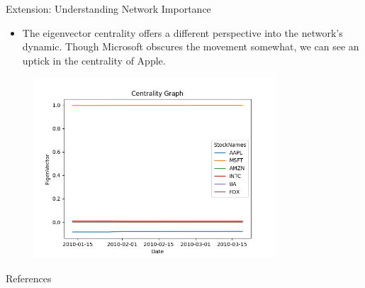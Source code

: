 \documentclass{beamer}
\begin{document}


\begin{frame}{Extension: Understanding Network Importance}
    \begin{itemize}
        \item The eigenvector centrality offers a different perspective into the network's dynamic. Though Microsoft obscures the movement somewhat, we can see an uptick in the centrality of Apple.
    \end{itemize}

    \begin{figure}
      \includegraphics[width=9cm]{EigenVectorCentralityPsi5Alpha0.18Beta13.png}
    \end{figure}
\end{frame}

\begin{frame}{References}
    \nocite{*}
    
    
\end{frame}
\end{document}
